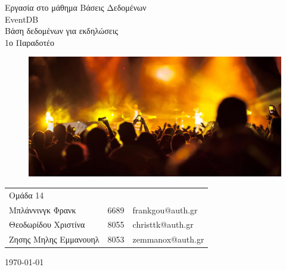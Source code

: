 \documentclass[11pt]{article}
\makeatletter
\newcommand{\ypertitlos}{Εργασία στο μάθημα Βάσεις Δεδομένων}
\newcommand{\titlos}{EventDB}
\newcommand{\ypotitlos}{Βάση δεδομένων για εκδηλώσεις}
\newcommand{\paradoteo}{1ο Παραδοτέο}
\newcommand{\omada}{Ομάδα 14}
\newcommand{\student}[3]{#1&#2&#3\\}
\newcommand{\melosA}{\student{Μπλάννινγκ Φρανκ}{6689}{frankgou@auth.gr}}
\newcommand{\melosB}{\student{Θεοδωρίδου Χριστίνα}{8055}{christtk@auth.gr}}
\newcommand{\melosC}{\student{Ζησης Μηλης Εμμανουηλ}{8053}{zemmanox@auth.gr}}
\newcommand{\hmnia}{\today}
\makeatother
\begin{document}
  \thispagestyle{empty}
  {\centering
    \Large\ypertitlos\\
    \vspace{7cm}
    \Huge\titlos\\
    \Large\ypotitlos\\
    \vspace{2cm}
  }
  \hfill \paradoteo

  \begin{figure}[H]
  \centering
  \includegraphics[width=\linewidth]{images/front.eps}
\end{figure}
  
  \vspace{8cm}
  \begin{tabular}[b]{l l l}
    \omada&&\\
    \melosA
    \melosB 
    \melosC
  \end{tabular}
  
  {\centering
    \vspace{2cm}
    \hmnia\\
  }
  \newpage

  \tableofcontents
  \listoffigures

  \newpage
  
  
  
  
  
  

\end{document}
